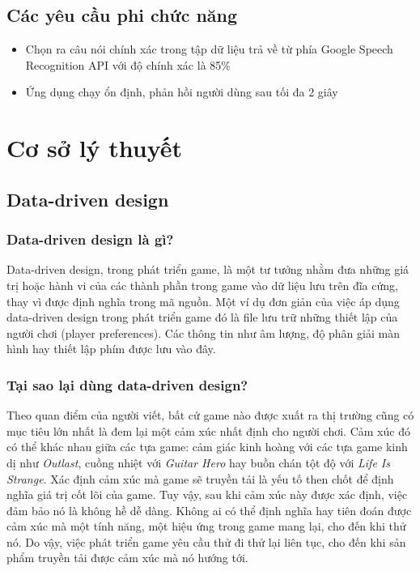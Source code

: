 \documentclass[12pt]{report}
\begin{document}
\section{Các yêu cầu phi chức năng}
\begin{itemize}
	\item Chọn ra câu nói chính xác trong tập dữ liệu trả về từ phía Google Speech Recognition API với độ chính xác là 85\%
	\item Ứng dụng chạy ổn định, phản hồi người dùng sau tối đa 2 giây
\end{itemize}

\chapter{Cơ sở lý thuyết}
\section{Data-driven design}
\subsection{Data-driven design là gì?}
Data-driven design, trong phát triển game, là một tư tưởng nhằm đưa những giá trị hoặc hành vi của các thành phần trong game vào dữ liệu lưu trên đĩa cứng, thay vì được định nghĩa trong mã nguồn. Một ví dụ đơn giản của việc áp dụng data-driven design trong phát triển game đó là file lưu trữ những thiết lập của người chơi (player preferences). Các thông tin như âm lượng, độ phân giải màn hình hay thiết lập phím được lưu vào đây.

\subsection{Tại sao lại dùng data-driven design?}
Theo quan điểm của người viết, bất cứ game nào được xuất ra thị trường cũng có mục tiêu lớn nhất là đem lại một cảm xúc nhất định cho người chơi. Cảm xúc đó có thể khác nhau giữa các tựa game: cảm giác kinh hoàng với các tựa game kinh dị như \textit{Outlast}, cuồng nhiệt với \textit{Guitar Hero} hay buồn chán tột độ với \textit{Life Is Strange}. Xác định cảm xúc mà game sẽ truyền tải là yếu tố then chốt để định nghĩa giá trị cốt lõi của game. Tuy vậy, sau khi cảm xúc này được xác định, việc đảm bảo nó là không hề dễ dàng. Không ai có thể định nghĩa hay tiên đoán được cảm xúc mà một tính năng, một hiệu ứng trong game mang lại, cho đến khi thử nó. Do vậy, việc phát triển game yêu cầu thử đi thử lại liên tục, cho đến khi sản phẩm truyền tải được cảm xúc mà nó hướng tới.
\end{document}
